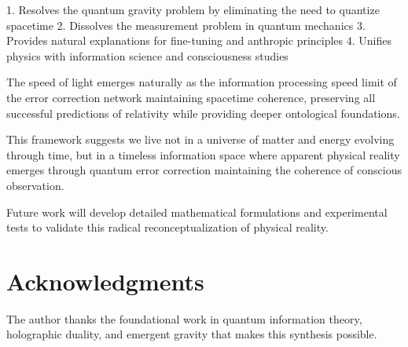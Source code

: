 \documentclass[12pt]{article}
\begin{document}
1. Resolves the quantum gravity problem by eliminating the need to quantize spacetime
2. Dissolves the measurement problem in quantum mechanics 
3. Provides natural explanations for fine-tuning and anthropic principles
4. Unifies physics with information science and consciousness studies

The speed of light emerges naturally as the information processing speed limit of the error correction network maintaining spacetime coherence, preserving all successful predictions of relativity while providing deeper ontological foundations.

This framework suggests we live not in a universe of matter and energy evolving through time, but in a timeless information space where apparent physical reality emerges through quantum error correction maintaining the coherence of conscious observation.

Future work will develop detailed mathematical formulations and experimental tests to validate this radical reconceptualization of physical reality.

\section*{Acknowledgments}

The author thanks the foundational work in quantum information theory, holographic duality, and emergent gravity that makes this synthesis possible.
\end{document}
